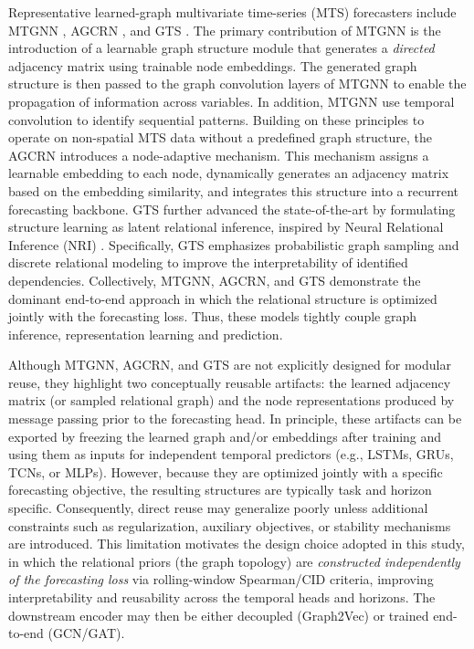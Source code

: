 Representative learned-graph multivariate time-series (\acs{MTS}) forecasters include \ac{MTGNN} \cite{wu2020connectingdotsmultivariatetime}, AGCRN \cite{bai2020adaptivegraphconvolutionalrecurrent}, and GTS \cite{shang2021discretegraphstructurelearning}. The primary contribution of \ac{MTGNN} is the introduction of a learnable graph structure module that generates a \emph{directed} adjacency matrix using trainable node embeddings. The generated graph structure is then passed to the graph convolution layers of \ac{MTGNN} to enable the propagation of information across variables. In addition, \ac{MTGNN} use temporal convolution to identify sequential patterns. Building on these principles to operate on non-spatial \acs{MTS} data without a predefined graph structure, the AGCRN introduces a node-adaptive mechanism. This mechanism assigns a learnable embedding to each node, dynamically generates an adjacency matrix based on the embedding similarity, and integrates this structure into a recurrent forecasting backbone. GTS further advanced the state-of-the-art by formulating structure learning as latent relational inference, inspired by Neural Relational Inference (NRI) \cite{kipf2018nri}. Specifically, GTS emphasizes probabilistic graph sampling and discrete relational modeling to improve the interpretability of identified dependencies. Collectively, \ac{MTGNN}, AGCRN, and GTS demonstrate the dominant end-to-end approach in which the relational structure is optimized jointly with the forecasting loss. Thus, these models tightly couple graph inference, representation learning and prediction.

Although \ac{MTGNN}, AGCRN, and GTS are not explicitly designed for modular reuse, they highlight two conceptually reusable artifacts: the learned adjacency matrix (or sampled relational graph) and the node representations produced by message passing prior to the forecasting head. In principle, these artifacts can be exported by freezing the learned graph and/or embeddings after training and using them as inputs for independent temporal predictors (e.g., \acp{LSTM}, \acp{GRU}, \acp{TCN}, or \acp{MLP}). However, because they are optimized jointly with a specific forecasting objective, the resulting structures are typically task and horizon specific. Consequently, direct reuse may generalize poorly unless additional constraints such as regularization, auxiliary objectives, or stability mechanisms are introduced. This limitation motivates the design choice adopted in this study, in which the
relational priors (the graph topology) are \emph{constructed independently of the
forecasting loss} via rolling-window Spearman/\acs{CID} criteria, improving
interpretability and reusability across the temporal heads and horizons. The downstream
encoder may then be either decoupled (Graph2Vec) or trained end-to-end (\acs{GCN}/\acs{GAT}).

